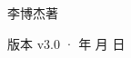 \begin{titlepage}
\vfill
{\LARGE\sffamily 李博杰\quad 著\par}
\vspace{0.7cm}
{\small\sffamily\color{structurecolor!80} 版本 v3.0 · \number\year 年 \number\month 月 \number\day 日\par}
\vspace{1.2cm}
\end{titlepage}
